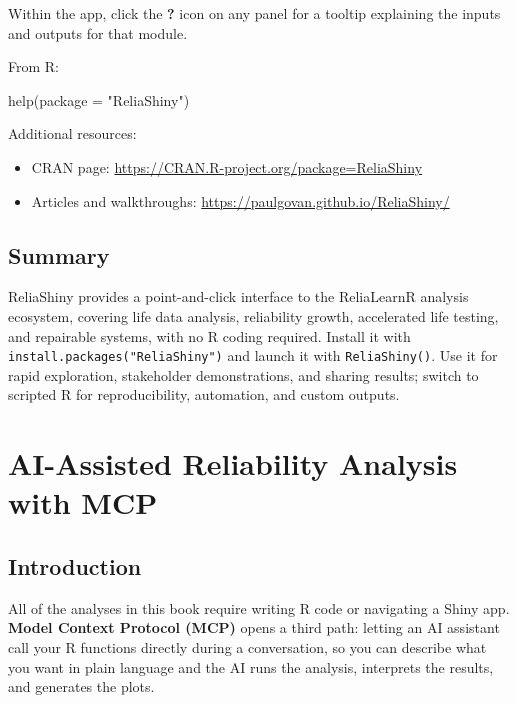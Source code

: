 \documentclass[
  letterpaper,
  DIV=11,
  numbers=noendperiod]{scrreprt}
\newenvironment{Shaded}{\begin{snugshade}}{\end{snugshade}}
\newcommand{\AttributeTok}[1]{\textcolor[rgb]{0.40,0.45,0.13}{#1}}
\newcommand{\FunctionTok}[1]{\textcolor[rgb]{0.28,0.35,0.67}{#1}}
\newcommand{\NormalTok}[1]{\textcolor[rgb]{0.00,0.23,0.31}{#1}}
\newcommand{\StringTok}[1]{\textcolor[rgb]{0.13,0.47,0.30}{#1}}
\providecommand{\tightlist}{%
  \setlength{\itemsep}{0pt}\setlength{\parskip}{0pt}}
\begin{document}
Within the app, click the \textbf{?} icon on any panel for a tooltip
explaining the inputs and outputs for that module.

From R:

\begin{Shaded}
\begin{Highlighting}[]
\FunctionTok{help}\NormalTok{(}\AttributeTok{package =} \StringTok{"ReliaShiny"}\NormalTok{)}
\end{Highlighting}
\end{Shaded}

Additional resources:

\begin{itemize}
\tightlist
\item
  CRAN page: \url{https://CRAN.R-project.org/package=ReliaShiny}
\item
  Articles and walkthroughs:
  \url{https://paulgovan.github.io/ReliaShiny/}
\end{itemize}

\section{Summary}\label{summary-7}

ReliaShiny provides a point-and-click interface to the ReliaLearnR
analysis ecosystem, covering life data analysis, reliability growth,
accelerated life testing, and repairable systems, with no R coding
required. Install it with \texttt{install.packages("ReliaShiny")} and
launch it with \texttt{ReliaShiny()}. Use it for rapid exploration,
stakeholder demonstrations, and sharing results; switch to scripted R
for reproducibility, automation, and custom outputs.


\chapter{AI-Assisted Reliability Analysis with MCP}\label{sec-mcp}

\section{Introduction}\label{introduction-8}

All of the analyses in this book require writing R code or navigating a
Shiny app. \textbf{Model Context Protocol (MCP)} opens a third path:
letting an AI assistant call your R functions directly during a
conversation, so you can describe what you want in plain language and
the AI runs the analysis, interprets the results, and generates the
plots.
\end{document}
